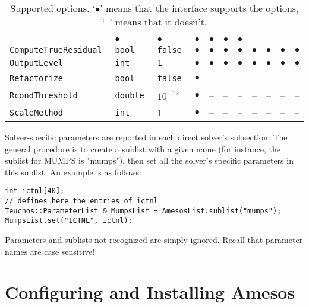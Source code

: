 \documentclass[11pt]{SANDreport}
\newcommand{\amesos}{{\sc Amesos}}
\begin{document}
\begin{sidewaystable}[tbhp]
\begin{tabular}{| p{5cm} | p{2cm} | p{2cm} | c | c | c
      | c | c | c | c | c |}
    & $\bullet$ & $\bullet$ &  $\bullet$ & $\bullet$ & $\bullet$ & $\bullet$ \\
    \tt ComputeTrueResidual & \tt bool   & \tt false  & $\bullet$ & $\bullet$
    & $\bullet$ & $\bullet$ &  $\bullet$ & $\bullet$ & $\bullet$  & $\bullet$\\
    \tt OutputLevel         & \tt int    & \tt 1      & $\bullet$ & $\bullet$
    & $\bullet$ & $\bullet$ &  $\bullet$ & $\bullet$ & $\bullet$  & $\bullet$\\
    \tt Refactorize         & \tt bool   & \tt false  & $\bullet$ & -- & -- & -- &  -- & -- & -- & -- \\
    \tt RcondThreshold      & \tt double & $10^{-12}$ & $\bullet$ & -- & -- & -- &  -- & -- & -- & -- \\
    \tt ScaleMethod         & \tt int    & 1          & $\bullet$ & -- & -- & -- &  -- & -- & -- & -- \\
    \hline
  \end{tabular}
  \caption{Supported options. `$\bullet$' means that the interface
    supports the options, `--' means that it doesn't.}
  \label{tab:options}
\end{sidewaystable}

Solver-specific parameters are reported in each direct solver's subsection.
The general procedure is to create a sublist with a given name (for
instance, the sublist for MUMPS is "mumps"), then set all the
solver's specific parameters in this sublist. An example is as follows:
\begin{verbatim}
int ictnl[40];
// defines here the entries of ictnl
Teuchos::ParameterList & MumpsList = AmesosList.sublist("mumps");
MumpsList.set("ICTNL", ictnl);
\end{verbatim}
Parameters and sublists not recognized are simply ignored. Recall that
parameter names are case sensitive!

\section{Configuring and Installing \amesos}
\label{sec:configuration}
\end{document}
